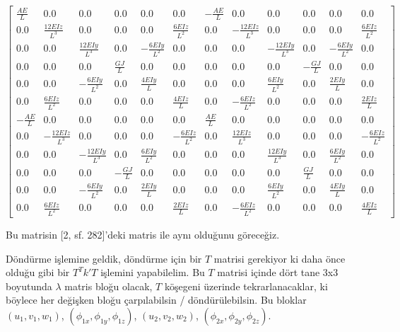 \documentclass[12pt,fleqn]{article}\usepackage{../../common}
\begin{document}
$$
\left[\begin{array}{cccccccccccc}\frac{A E}{L} & 0.0 & 0.0 & 0.0 & 0.0 & 0.0 & - \frac{A E}{L} & 0.0 & 0.0 & 0.0 & 0.0 & 0.0\\0.0 & \frac{12 E Iz}{L^{3}} & 0.0 & 0.0 & 0.0 & \frac{6 E Iz}{L^{2}} & 0.0 & - \frac{12 E Iz}{L^{3}} & 0.0 & 0.0 & 0.0 & \frac{6 E Iz}{L^{2}}\\0.0 & 0.0 & \frac{12 E Iy}{L^{3}} & 0.0 & - \frac{6 E Iy}{L^{2}} & 0.0 & 0.0 & 0.0 & - \frac{12 E Iy}{L^{3}} & 0.0 & - \frac{6 E Iy}{L^{2}} & 0.0\\0.0 & 0.0 & 0.0 & \frac{G J}{L} & 0.0 & 0.0 & 0.0 & 0.0 & 0.0 & - \frac{G J}{L} & 0.0 & 0.0\\0.0 & 0.0 & - \frac{6 E Iy}{L^{2}} & 0.0 & \frac{4 E Iy}{L} & 0.0 & 0.0 & 0.0 & \frac{6 E Iy}{L^{2}} & 0.0 & \frac{2 E Iy}{L} & 0.0\\0.0 & \frac{6 E Iz}{L^{2}} & 0.0 & 0.0 & 0.0 & \frac{4 E Iz}{L} & 0.0 & - \frac{6 E Iz}{L^{2}} & 0.0 & 0.0 & 0.0 & \frac{2 E Iz}{L}\\- \frac{A E}{L} & 0.0 & 0.0 & 0.0 & 0.0 & 0.0 & \frac{A E}{L} & 0.0 & 0.0 & 0.0 & 0.0 & 0.0\\0.0 & - \frac{12 E Iz}{L^{3}} & 0.0 & 0.0 & 0.0 & - \frac{6 E Iz}{L^{2}} & 0.0 & \frac{12 E Iz}{L^{3}} & 0.0 & 0.0 & 0.0 & - \frac{6 E Iz}{L^{2}}\\0.0 & 0.0 & - \frac{12 E Iy}{L^{3}} & 0.0 & \frac{6 E Iy}{L^{2}} & 0.0 & 0.0 & 0.0 & \frac{12 E Iy}{L^{3}} & 0.0 & \frac{6 E Iy}{L^{2}} & 0.0\\0.0 & 0.0 & 0.0 & - \frac{G J}{L} & 0.0 & 0.0 & 0.0 & 0.0 & 0.0 & \frac{G J}{L} & 0.0 & 0.0\\0.0 & 0.0 & - \frac{6 E Iy}{L^{2}} & 0.0 & \frac{2 E Iy}{L} & 0.0 & 0.0 & 0.0 & \frac{6 E Iy}{L^{2}} & 0.0 & \frac{4 E Iy}{L} & 0.0\\0.0 & \frac{6 E Iz}{L^{2}} & 0.0 & 0.0 & 0.0 & \frac{2 E Iz}{L} & 0.0 & - \frac{6 E Iz}{L^{2}} & 0.0 & 0.0 & 0.0 & \frac{4 E Iz}{L}\end{array}\right]
$$

Bu matrisin [2, sf. 282]'deki matris ile aynı olduğunu göreceğiz.

Döndürme işlemine geldik, döndürme için bir $T$ matrisi gerekiyor ki daha önce
olduğu gibi bir $T^T k' T$ işlemini yapabilelim. Bu $T$ matrisi içinde dört tane
3x3 boyutunda $\lambda$ matris bloğu olacak, $T$ köşegeni üzerinde
tekrarlanacaklar, ki böylece her değişken bloğu çarpılabilsin /
döndürülebilsin. Bu bloklar $(u_1,v_1,w_1)$, $(\phi_{1x},\phi_{1y},\phi_{1z})$,
$(u_2,v_2,w_2)$, $(\phi_{2x},\phi_{2y},\phi_{2z})$.
\end{document}
